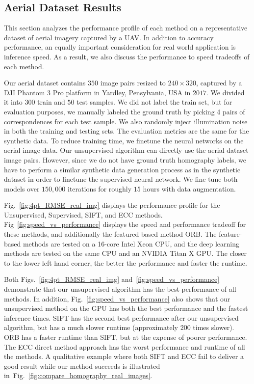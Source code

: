 \documentclass[letterpaper, 10 pt, conference]{ieeeconf}
\begin{document}
\subsection{Aerial Dataset Results}
This section analyzes the performance profile of each method on a representative dataset of aerial imagery captured by a UAV. In addition to accuracy performance, an equally important consideration for real world application is inference speed. As a result, we also discuss the performance to speed tradeoffs of each method.

Our aerial dataset contains $350$ image pairs resized to $240 \times 320$, captured by a DJI Phantom $3$ Pro platform in Yardley, Pensylvania, USA in $2017$. We divided it into $300$ train and $50$ test samples. We did not label the train set, but for evaluation purposes, we manually labeled the ground truth by picking 4 pairs of correspondences for each test sample. We also randomly inject illumination noise in both the training and testing sets. The evaluation metrics are the same for the synthetic data. To reduce training time, we finetune the neural networks on the aerial image data. Our unsupervised algorithm can directly use the aerial dataset image pairs. However, since we do not have ground truth homography labels, we have to perform a similar synthetic data generation process as in the synthetic dataset in order to finetune the supervised neural network. We fine tune both models over $150,000$ iterations for roughly $15$ hours with data augmentation.

Fig.~\ref{fig:4pt_RMSE_real_img} displays the performance profile for the Unsupervised, Supervised, SIFT, and ECC methods. Fig~\ref{fig:speed_vs_performance} displays the speed and performance tradeoff for these methods, and additionally the featured based method ORB. The feature-based methods are tested on a 16-core Intel Xeon CPU, and the deep learning methods are tested on the same CPU and an NVIDIA Titan X GPU. The closer to the lower left hand corner, the better the performance and faster the runtime.

Both Figs.~\ref{fig:4pt_RMSE_real_img} and~\ref{fig:speed_vs_performance} demonstrate that our unsupervised algorithm has the best performance of all methods. In addition, Fig.~\ref{fig:speed_vs_performance} also shows that our unsupervised method on the GPU has both the best performance and the fastest inference times. SIFT has the second best performance after our unsupervised algorithm, but has a much slower runtime (approximately $200$ times slower). ORB has a faster runtime than SIFT, but at the expense of poorer performance. The ECC direct method approach has the worst performance and runtime of all the methods. A qualitative example where both SIFT and ECC fail to deliver a good result while our method succeeds is illustrated in~Fig.~\ref{fig:compare_homography_real_images}.
\end{document}
